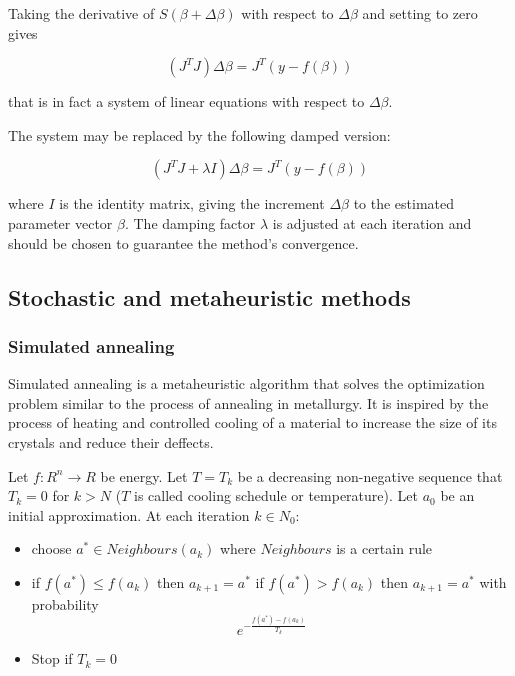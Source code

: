Taking the derivative of $S(\beta + \Delta \beta)$ with respect to $\Delta \beta$ and setting to zero gives

\begin{equation*}
    (J^T J)\Delta \beta = J^T(y - f(\beta))
\end{equation*}

that is in fact a system of linear equations with respect to $\Delta \beta$.

The system may be replaced by the following damped version:

\begin{equation*}
    (J^T J + \lambda I)\Delta \beta = J^T(y - f(\beta))
\end{equation*}

where $I$ is the identity matrix, giving the increment $\Delta \beta$ to the estimated parameter vector $\beta$. The damping factor $\lambda$ is adjusted at each iteration and should be chosen to guarantee the method's convergence.

\subsection*{Stochastic and metaheuristic methods}
\subsubsection*{Simulated annealing}
Simulated annealing is a metaheuristic algorithm that solves the optimization problem similar to the process of annealing in metallurgy.
It is inspired by the process of heating and controlled cooling of a material to increase the size of its crystals and reduce their deffects.

Let $f: R^n \rightarrow R$ be energy. Let $T = {T_k}$ be a decreasing non-negative sequence that $T_k = 0$ for $k > N$ ($T$ is called cooling schedule or temperature).
Let $a_0$ be an initial approximation. At each iteration $k \in N_0$:

\begin{itemize}
    \item choose $a^{*} \in Neighbours(a_k)$ where $Neighbours$ is a certain rule
    \item if $f(a^{*}) \leq f(a_k)$ then $a_{k+1} = a^{*}$ if $f(a^{*}) > f(a_k)$ then $a_{k + 1} = a^{*}$ with probability
    \begin{equation*}
        e^{-\frac{f(a^{*}) - f(a_k)}{T_k}}
    \end{equation*}
    \item Stop if $T_k = 0$
\end{itemize}

